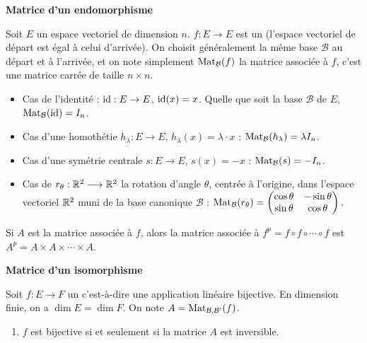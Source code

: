 \documentclass[10pt,class=article,crop=false]{standalone}
\begin{document}
\begin{multicols}{2}
\textbf{Matrice d'un endomorphisme}

Soit $E$ un espace vectoriel de dimension $n$.
$f : E \to E$ est un  (l'espace vectoriel de départ est égal à celui d'arrivée). On choisit généralement la même base $\mathcal{B}$ au départ et à l'arrivée, et on note simplement $\operatorname{Mat}_{\mathcal{B}} (f)$ la matrice associée à $f$, c'est une matrice carrée de taille $n\times n$.

\begin{exemple}
	\sauteligne
	\begin{itemize}
		\item Cas de l'identité : $\operatorname{id} : E \to E$, $\operatorname{id}(x)=x$.		
		Quelle que soit la base $\mathcal{B}$ de $E$, $\operatorname{Mat}_{\mathcal{B}} (\operatorname{id}) = I_n$. 		
		\item Cas d'une homothétie $h_\lambda : E \to E$, $h_\lambda(x) = \lambda \cdot x$ :
		$\operatorname{Mat}_{\mathcal{B}} (h_\lambda) = \lambda I_n$.
		
		\item Cas d'une symétrie centrale $s : E \to E$, $s(x) = - x$ :
		$\operatorname{Mat}_{\mathcal{B}} (s) = - I_n$.
		
		\item Cas de $r_\theta : \mathbb{R}^2 \longrightarrow \mathbb{R}^2$ la rotation d'angle $\theta$,
		centrée à l'origine, dans l'espace vectoriel $\mathbb{R}^2$ muni de la base canonique $\mathcal{B}$ :
		$\operatorname{Mat}_{\mathcal{B}} (r_\theta) =
		\begin{pmatrix}
			\cos\theta & -\sin\theta\\
			\sin\theta & \cos\theta
		\end{pmatrix}.$
	
	\end{itemize}
	
\end{exemple}

Si $A$ est la matrice associée à $f$, alors
la matrice associée à $f^p = f \circ f \circ\cdots \circ f$
est $A^p = A \times A \times \cdots \times A$.

\textbf{Matrice d'un isomorphisme}

Soit $f : E \to F$ un  c'est-à-dire une application linéaire bijective. En dimension finie, on a $\dim E = \dim F$.
On note $A = \operatorname{Mat}_{\mathcal{B},\mathcal{B}'} (f)$.

\begin{theoreme}
\sauteligne	
	\begin{enumerate}
		\item $f$ est bijective si et seulement si la matrice $A$ est inversible.
		

\end{enumerate}
\end{theoreme}
\end{multicols}
\end{document}
